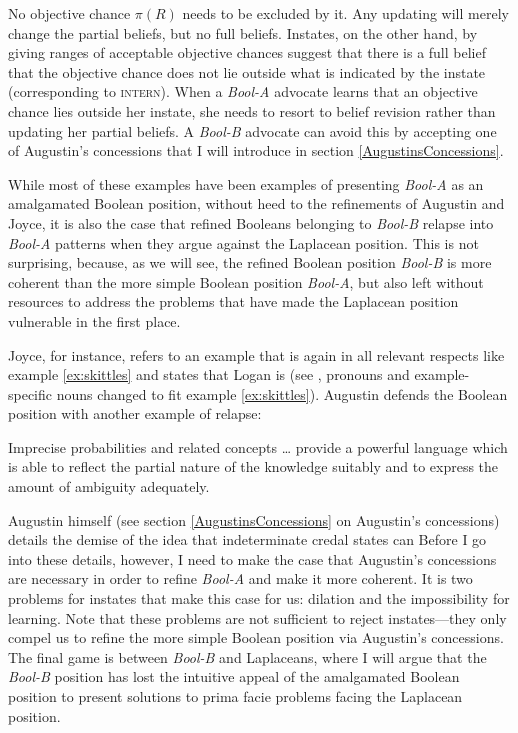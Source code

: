 \documentclass[11pt]{article}
\newcommand{\anderson}[0]{\textit{Bool-A}}
\newcommand{\augustin}[0]{\textit{Bool-B}}
\begin{document}
No objective chance $\pi(R)$ needs to be excluded by it. Any updating
will merely change the partial beliefs, but no full beliefs. Instates,
on the other hand, by giving ranges of acceptable objective chances
suggest that there is a full belief that the objective chance does not
lie outside what is indicated by the instate (corresponding to
\textsc{intern}). When a {\anderson} advocate learns that an objective
chance lies outside her instate, she needs to resort to belief
revision rather than updating her partial beliefs. A {\augustin}
advocate can avoid this by accepting one of Augustin's concessions
that I will introduce in section \ref{AugustinsConcessions}.

While most of these examples have been examples of presenting
{\anderson} as an amalgamated Boolean position, without heed to the
refinements of Augustin and Joyce, it is also the case that refined
Booleans belonging to {\augustin} relapse into {\anderson} patterns
when they argue against the Laplacean position. This is not
surprising, because, as we will see, the refined Boolean position
{\augustin} is more coherent than the more simple Boolean position
{\anderson}, but also left without resources to address the problems
that have made the Laplacean position vulnerable in the first place.

Joyce, for instance, refers to an example that is again in all
relevant respects like example \ref{ex:skittles} and states that Logan
is  (see ,
pronouns and example-specific nouns changed to fit example
\ref{ex:skittles}). Augustin defends the Boolean position with another
example of relapse:

\begin{quotex}
  Imprecise probabilities and related concepts {\ldots} provide a
  powerful language which is able to reflect the partial nature of the
  knowledge suitably and to express the amount of ambiguity
  adequately. 
\end{quotex}

Augustin himself (see section \ref{AugustinsConcessions} on Augustin's
concessions) details the demise of the idea that indeterminate credal
states can  Before
I go into these details, however, I need to make the case that
Augustin's concessions are necessary in order to refine {\anderson}
and make it more coherent. It is two problems for instates that make
this case for us: dilation and the impossibility for learning. Note
that these problems are not sufficient to reject instates---they only
compel us to refine the more simple Boolean position via Augustin's
concessions. The final game is between {\augustin} and Laplaceans,
where I will argue that the {\augustin} position has lost the
intuitive appeal of the amalgamated Boolean position to present
solutions to prima facie problems facing the Laplacean position.
\end{document}
